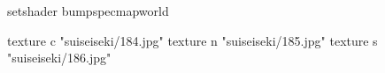 setshader bumpspecmapworld

    texture c "suiseiseki/184.jpg"
    texture n "suiseiseki/185.jpg"
    texture s "suiseiseki/186.jpg"
